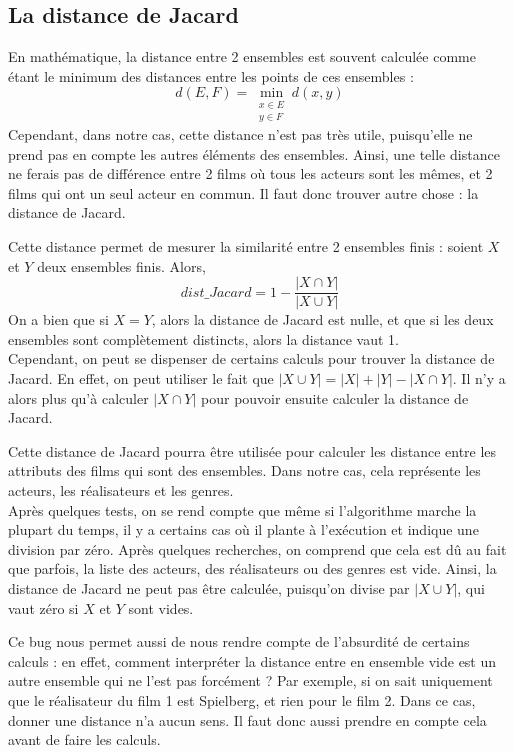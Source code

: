 \documentclass[11pt,a4paper]{report}
\begin{document}
\subsection{La distance de Jacard}
En mathématique, la distance entre 2 ensembles est souvent calculée comme étant le minimum des distances entre les points de ces ensembles :
\[d(E,F)=\min_{\substack{x\in E \\ y\in F}} d(x,y)\]
Cependant, dans notre cas, cette distance n'est pas très utile, puisqu'elle ne prend pas en compte les autres éléments des ensembles. Ainsi, une telle distance ne ferais pas de différence entre 2 films où tous les acteurs sont les mêmes, et 2 films qui ont  un seul acteur en commun. Il faut donc trouver autre chose : la distance de Jacard.\par
Cette distance permet de mesurer la similarité entre 2 ensembles finis : soient $X$ et $Y$ deux ensembles finis. Alors,
\[dist\_Jacard=1-\frac{|X \cap Y|}{|X \cup Y|}\]
On a bien que si \(X=Y\), alors la distance de Jacard est nulle, et que si les deux ensembles sont complètement distincts, alors la distance vaut 1.\\
Cependant, on peut se dispenser de certains calculs pour trouver la distance de Jacard. En effet, on peut utiliser le fait que \(|X \cup Y|=|X|+|Y|-|X \cap Y|\). Il n'y a alors plus qu'à calculer \(|X \cap Y|\) pour pouvoir ensuite calculer la distance de Jacard.\par
Cette distance de Jacard pourra être utilisée pour calculer les distance entre les attributs des films qui sont des ensembles. Dans notre cas, cela représente les acteurs, les réalisateurs et les genres.\\
Après quelques tests, on se rend compte que même si l'algorithme marche la plupart du temps, il y a certains cas où il plante à l'exécution et indique une division par zéro. Après quelques recherches, on comprend que cela est dû au fait que parfois, la liste des acteurs, des réalisateurs ou des genres est vide. Ainsi, la distance de Jacard ne peut pas être calculée, puisqu'on divise par \(|X \cup Y|\), qui vaut zéro si $X$ et $Y$ sont vides.\par
Ce bug nous permet aussi de nous rendre compte de l'absurdité de certains calculs : en effet, comment interpréter la distance entre en ensemble vide est un autre ensemble qui ne l'est pas forcément ? Par exemple, si on sait uniquement que le réalisateur du film 1 est Spielberg, et rien pour le film 2. Dans ce cas, donner une distance n'a aucun sens. Il faut donc aussi prendre en compte cela avant de faire les calculs.\par
\end{document}
